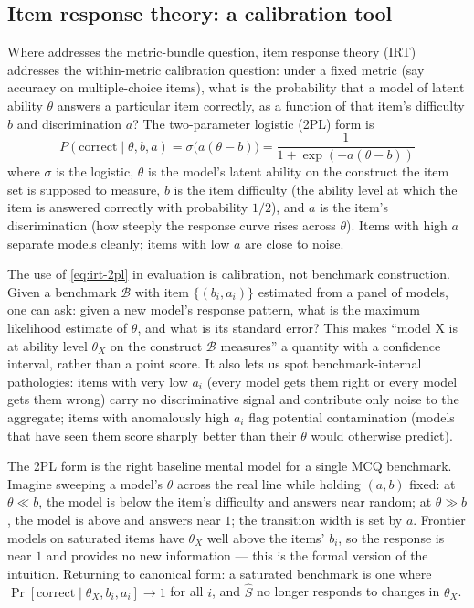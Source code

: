 \subsection{Item response theory: a calibration tool}
\label{sec:measuring-irt}

Where  addresses the metric-bundle question, item response theory
(IRT) addresses the within-metric calibration question: under a
fixed metric (say accuracy on multiple-choice items), what is the
probability that a model of latent ability $\theta$ answers a
particular item correctly, as a function of that item's difficulty
$b$ and discrimination $a$? The two-parameter logistic (2PL) form
 is
\begin{equation}
P(\text{correct} \mid \theta, b, a) = \sigma\!\big(a(\theta - b)\big)
  = \frac{1}{1 + \exp(-a(\theta - b))}
\label{eq:irt-2pl}
\end{equation}
where $\sigma$ is the logistic, $\theta$ is the model's latent
ability on the construct the item set is supposed to measure, $b$ is
the item difficulty (the ability level at which the item is
answered correctly with probability $1/2$), and $a$ is the item's
discrimination (how steeply the response curve rises across
$\theta$). Items with high $a$ separate models cleanly; items with
low $a$ are close to noise.

The use of \eqref{eq:irt-2pl} in  evaluation is calibration, not
benchmark construction. Given a benchmark $\mathcal{B}$ with item
 $\{(b_i, a_i)\}$ estimated from a panel of models, one
can ask: given a new model's response pattern, what is the maximum
likelihood estimate of $\theta$, and what is its standard error?
This makes ``model X is at ability level $\theta_X$ on the
construct $\mathcal{B}$ measures'' a quantity with a confidence
interval, rather than a point score. It also lets us spot
benchmark-internal pathologies: items with very low $a_i$ (every
model gets them right or every model gets them wrong) carry no
discriminative signal and contribute only noise to the aggregate;
items with anomalously high $a_i$ flag potential contamination
(models that have seen them score sharply better than their
$\theta$ would otherwise predict).

\begin{intuition}
The 2PL form is the right baseline mental model for a single MCQ
benchmark. Imagine sweeping a model's $\theta$ across the real line
while holding $(a, b)$ fixed: at $\theta \ll b$, the model is below
the item's difficulty and answers near random; at $\theta \gg b$, the
model is above and answers near $1$; the transition width is set by
$a$. Frontier models on saturated  items have $\theta_X$ well
above the items' $b_i$, so the response is near $1$ and provides no
new information --- this is the formal version of the 
intuition. Returning to canonical form: a saturated benchmark is
one where $\Pr[\text{correct} \mid \theta_X, b_i, a_i] \to 1$ for all
$i$, and $\hat{S}$ no longer responds to changes in $\theta_X$.
\end{intuition}

